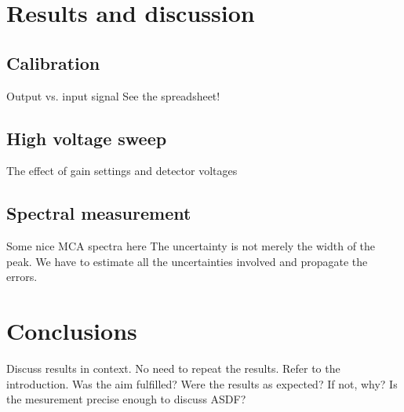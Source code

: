 \documentclass[a4paper]{article}
\begin{document}
\FloatBarrier
\section{Results and discussion}
\label{results}


\subsection{Calibration}
\label{results_calibration}
Output vs. input signal
See the spreadsheet!

\subsection{High voltage sweep}
\label{results_hv}
The effect of gain settings and detector voltages

\subsection{Spectral measurement}
\label{results_spectral}
Some nice MCA spectra here
The uncertainty is not merely the width of the peak. We have to estimate all the uncertainties involved and propagate the errors.


\section{Conclusions}
\label{conclusions}
Discuss results in context.
No need to repeat the results.
Refer to the introduction.
Was the aim fulfilled?
Were the results as expected? If not, why?
Is the mesurement precise enough to discuss ASDF?
\end{document}
